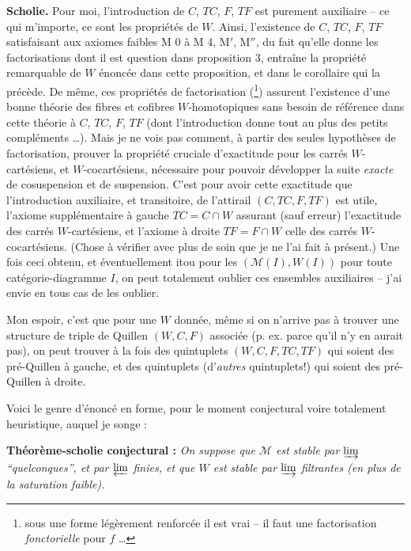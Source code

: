 \documentclass[11pt]{article}
\newcommand{\msp}[1]{\marginpar{\footnotesize [#1]}}
\newcommand{\cM}{\mathcal{M}}
\begin{document}
\textbf{Scholie.} Pour moi, l'introduction de $C$, $TC$, $F$, $TF$ est purement auxiliaire – ce qui m'importe, ce sont les propriétés de $W$. Ainsi, l'existence de $C$, $TC$, $F$, $TF$ satisfaisant aux axiomes faibles M 0 à M 4, M$'$, M$''$, du fait qu'elle donne les factorisations
\msp{page 13}
dont il est question dans proposition 3, entraîne la propriété remarquable de $W$ énoncée dans cette proposition, et dans le corollaire qui la précède. De même, ces propriétés de factorisation (\footnote{sous une forme légèrement renforcée il est vrai – il faut une factorisation \textit{fonctorielle} pour $f$ \dots}) assurent l'existence d'une bonne théorie des fibres et cofibres $W$-homotopiques sans besoin de référence dans cette théorie à $C$, $TC$, $F$, $TF$ (dont l'introduction donne tout au plus des petits compléments \dots). Mais je ne vois pas comment, à partir des seules hypothèses de factorisation, prouver la propriété cruciale d'exactitude pour les carrés $W$-cartésiens, et $W$-cocartésiens, nécessaire pour pouvoir développer la suite \textit{exacte} de cosuspension et de suspension. C'est pour avoir cette exactitude que l'introduction auxiliaire, et transitoire, de l'attirail $(C,TC,F,TF)$ est utile, l'axiome supplémentaire à gauche $TC=C\cap W$ assurant (sauf erreur) l'exactitude des carrés $W$-cartésiens, et l'axiome à droite $TF=F\cap W$ celle des carrés $W$-cocartésiens. (Chose à vérifier avec plus de soin que je ne l'ai fait à présent.) Une fois ceci obtenu, et éventuellement itou pour les $(\cM(I),W(I))$ pour toute catégorie-diagramme $I$, on peut
\msp{page 14}
totalement oublier ces ensembles auxiliaires – j'ai envie en tous cas de les oublier.

Mon espoir, c'est que pour une $W$ donnée, même si on n'arrive pas à trouver une structure de triple de Quillen $(W,C,F)$ associée (p. ex. parce qu'il n'y en aurait pas), on peut trouver à la fois des quintuplets $(W,C,F,TC,TF)$ qui soient des pré-Quillen à gauche, et des quintuplets (d'\textit{autres} quintuplets!) qui soient des pré-Quillen à droite.

Voici le genre d'énoncé en forme, pour le moment conjectural voire totalement heuristique, auquel je songe :

\textbf{Théorème-scholie conjectural :} \textit{On suppose que $\cM$ est stable par $\varinjlim$ “quelconques”, et par $\varprojlim$ finies, et que $W$ est stable par $\varinjlim$ filtrantes (en plus de la saturation faible).}
\end{document}
